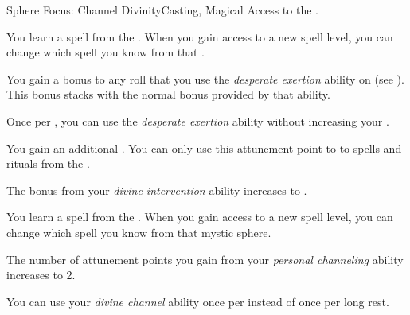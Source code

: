     \begin{feat}{Sphere Focus: Channel Divinity}{Casting, Magical}
        \featpre Access to the  .

         You learn a spell from the  .
        When you gain access to a new spell level, you can change which spell you know from that .

         You gain a  bonus to any roll that you use the \textit{desperate exertion} ability on (see ).
        This bonus stacks with the normal  bonus provided by that ability.

         Once per , you can use the \textit{desperate exertion} ability without increasing your .

         You gain an additional .
        You can only use this attunement point to  to spells and rituals from the  .

         The bonus from your \textit{divine intervention} ability increases to .

         You learn a spell from the  .
        When you gain access to a new spell level, you can change which spell you know from that mystic sphere.

         The number of attunement points you gain from your \textit{personal channeling} ability increases to 2.

         You can use your \textit{divine channel} ability once per  instead of once per long rest.
    \end{feat}


